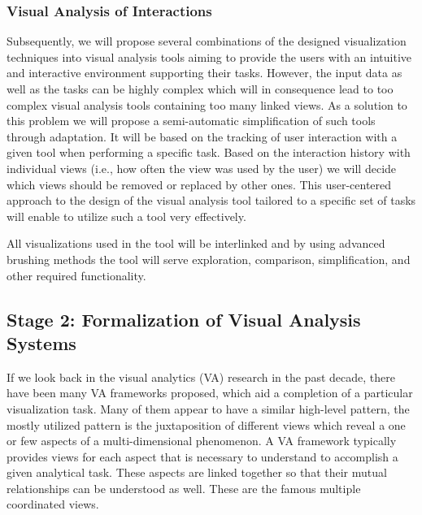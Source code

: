 \documentclass[11pt,a4paper,titlepage,oneside,onecolumn]{article}
\begin{document}

\subsubsection{Visual Analysis of Interactions}
Subsequently, we will propose several combinations of the designed visualization techniques into visual analysis tools aiming to provide the users with an intuitive and interactive environment supporting their tasks.
However, the input data as well as the tasks can be highly complex which will in consequence lead to too complex visual analysis tools containing too many linked views.
As a solution to this problem we will propose a semi-automatic simplification of such tools through adaptation.
It will be based on the tracking of user interaction with a given tool when performing a specific task.
Based on the interaction history with individual views (i.e., how often the view was used by the user) we will decide which views should be removed or replaced by other ones. 
This user-centered approach to the design of the visual analysis tool tailored to a specific set of tasks will enable to utilize such a tool very effectively.

All visualizations used in the tool will be interlinked and by using advanced brushing methods the tool will serve exploration, comparison, simplification, and other required functionality.



\subsection{Stage 2: Formalization of Visual Analysis Systems}
If we look back in the visual analytics (VA) research in the past decade, there have been many VA frameworks proposed, which aid a completion of a particular visualization task. Many of them appear to have a similar high-level pattern, the mostly utilized pattern is the juxtaposition of different views which reveal a one or few aspects of a multi-dimensional phenomenon. A VA framework typically provides views for each aspect that is necessary to understand to accomplish a given analytical task. These aspects are linked together so that their mutual relationships can be understood as well. These are the famous multiple coordinated views.
\end{document}

